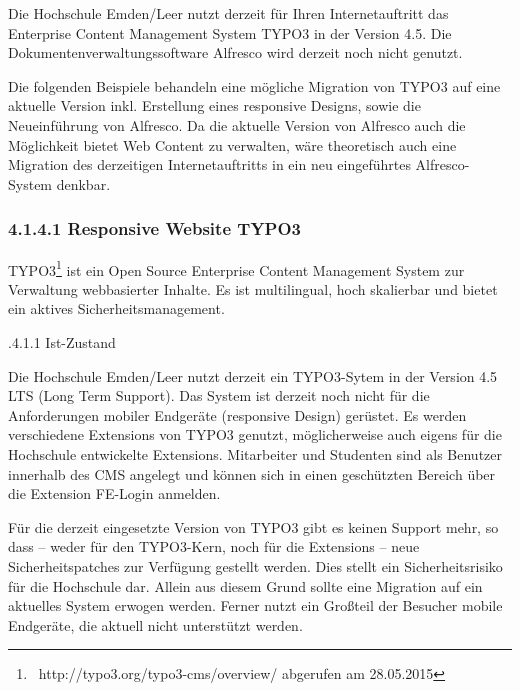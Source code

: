 \documentclass[a4paper]{article}
\begin{document}
\bigskip

{\sffamily
Die Hochschule Emden/Leer nutzt derzeit für Ihren Internetauftritt das Enterprise Content Management System TYPO3 in der
Version 4.5. Die Dokumentenverwaltungssoftware Alfresco wird derzeit noch nicht genutzt. }


\bigskip

{\sffamily
Die folgenden Beispiele behandeln eine mögliche Migration von TYPO3 auf eine aktuelle Version inkl. Erstellung eines
responsive Designs, sowie die Neueinführung von Alfresco. Da die aktuelle Version von Alfresco auch die Möglichkeit
bietet Web Content zu verwalten, wäre theoretisch auch eine Migration des derzeitigen Internetauftritts in ein neu
eingeführtes Alfresco-System denkbar.}

\subsubsection[4.1.4.1 Responsive Website TYPO3]{\textbf{4.1.4.1 Responsive Website TYPO3}}
{\sffamily
TYPO3\footnote{\ http://typo3.org/typo3-cms/overview/ abgerufen am 28.05.2015} ist ein Open Source Enterprise Content
Management System zur Verwaltung webbasierter Inhalte. Es ist multilingual, hoch skalierbar und bietet ein aktives
Sicherheitsmanagement.}


\bigskip

{.4.1.1 Ist-Zustand}


\bigskip

{\sffamily
Die Hochschule Emden/Leer nutzt derzeit ein TYPO3-Sytem in der Version 4.5 LTS (Long Term Support). Das System ist
derzeit noch nicht für die Anforderungen mobiler Endgeräte (responsive Design) gerüstet. Es werden verschiedene
Extensions von TYPO3 genutzt, möglicherweise auch eigens für die Hochschule entwickelte Extensions. Mitarbeiter und
Studenten sind als Benutzer innerhalb des CMS angelegt und können sich in einen geschützten Bereich über die Extension
FE-Login anmelden.}


\bigskip

{\sffamily
Für die derzeit eingesetzte Version von TYPO3 gibt es keinen Support mehr, so dass – weder für den TYPO3-Kern, noch für
die Extensions – neue Sicherheitspatches zur Verfügung gestellt werden. Dies stellt ein Sicherheitsrisiko für die
Hochschule dar. Allein aus diesem Grund sollte eine Migration auf ein aktuelles System erwogen werden. Ferner nutzt ein
Großteil der Besucher mobile Endgeräte, die aktuell nicht unterstützt werden.}
\end{document}
